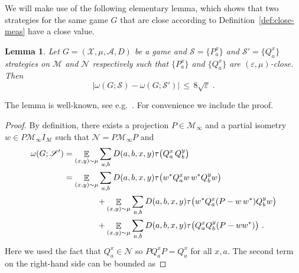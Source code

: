 \documentclass[11pt]{article}
\newtheorem{lemma}[theorem]{Lemma}
\theoremstyle{definition}
\newcommand{\strategy}{\mathscr{S}}
\newcommand{\ket}[1]{|#1\rangle}
\newcommand{\bra}[1]{\langle#1|}
\DeclareMathOperator*{\Expectation}{\mathbb{E}}
\newcommand{\Es}[1]{\Expectation_{#1}}
\newcommand{\mA}{\ensuremath{\mathcal{A}}}
\newcommand{\mM}{\ensuremath{\mathcal{M}}}
\newcommand{\mX}{\ensuremath{\mathcal{X}}}
\newcommand{\eps}{\varepsilon}
\newcommand{\mN}{\mathcal{N}}
\begin{document}
We will make use of the following elementary lemma, which shows that two strategies for the same game $G$ that are close according to Definition~\ref{def:close-meas} have a close value. 

\begin{lemma}\label{lem:close-value}
Let $G=(\mX,\mu,\mA,D)$ be a game and $\strategy=\{P^x_a\}$ and $\strategy'=\{Q^x_a\}$ strategies on $\mM$ and $\mN$ respectively such that $\{P^x_a\}$ and $\{Q^x_a\}$ are $(\eps,\mu)$-close. Then 
\[ \big|\omega(G;\strategy) - \omega(G;\strategy')\big|\,\leq\, 8\sqrt{\eps} \;.\]
\end{lemma}

The lemma is well-known, see e.g.~\cite[Lemma 5.28]{ji2020mip}. For convenience we include the proof. 

\begin{proof}
By definition, there exists a projection $P \in \mM_\infty$ and a partial isometry $w \in P \mM_\infty I_\mM$ such that $\mN = P \mM_\infty P$ and
\begin{align}
\omega(G;\strategy') &= \Es{(x,y)\sim\mu} \sum_{a,b} D(a,b,x,y)  \tau\big( Q^x_a \, Q^y_b \big)\notag\\
&=  \Es{(x,y)\sim\mu} \sum_{a,b} D(a,b,x,y)  \tau\big( w^* Q^x_a w\, w^* Q^y_b w\big)\notag\\
&\qquad\qquad+  \Es{(x,y)\sim\mu} \sum_{a,b} D(a,b,x,y)  \tau\big( w^* Q^x_a (P - w\, w^* ) Q^y_b w\big) \notag\\
&\qquad\qquad+ \Es{(x,y)\sim\mu} \sum_{a,b} D(a,b,x,y)  \tau\big(Q^x_a  Q^y_b (P-ww^*)\big)~.\label{eq:cv-0}
\end{align}
Here we used the fact that $Q^x_a \in \mN$ so $P Q^x_a P = Q^x_a$ for all $x,a$. 
The second term on the right-hand side can be bounded as

\end{proof}
\end{document}
